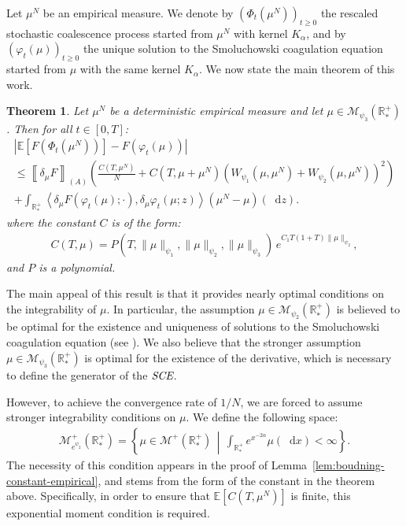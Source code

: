 \documentclass[11pt,a4paper]{article}
\newcommand{\RRP}{\mathbb{R}^+_*}
\newcommand{\MC}{\mathcal{M}}
\newcommand{\SCE}{\emph{SCE}}
\newcommand{\A}{(A)}
\newcommand{\Proc}[1]{\left(#1\right)_{t\geq 0}}
\newcommand{\dd}{\mathop{}\!\mathrm{d}}
\newtheorem{theorem}{Theorem}[section]
\begin{document}
Let $\mu^N$ be an empirical measure. We denote by \(\Proc{\Phi_t(\mu^N)}\) the rescaled stochastic coalescence process started from \(\mu^N\) with kernel \(K_\alpha\), and by \(\Proc{\varphi_t(\mu)}\) the unique solution to the Smoluchowski coagulation equation started from \(\mu\) with the same kernel \(K_\alpha\). We now state the main theorem of this work.

\begin{theorem}\label{thm:main-result}
    Let $\mu^N$ be a deterministic empirical measure and let $\mu \in \MC_{\psi_3}(\RRP)$. Then for all $t \in [0,T]$:
    \begin{multline*}
        \left| \mathbb{E}\left[F\left(\Phi_t\left(\mu^N\right)\right)\right] - F\left(\varphi_t(\mu)\right) \right| \\
        \leq \left\llbracket \delta_\mu F \right\rrbracket_{\A} \left( \frac{C(T,\mu^N)}{N} + C(T,\mu + \mu^N)\left(W_{\psi_1}\left(\mu,\mu^N\right) + W_{\psi_2}\left(\mu,\mu^N\right) \right)^2\right) \\
        + \int_{\RRP} \left\langle \delta_\mu F\left(\varphi_t \left(\mu\right);\cdot \right), \delta_\mu \varphi_t\left(\mu;z \right) \right\rangle \left(\mu^N - \mu\right)(\dd z).
    \end{multline*}
    where the constant $C$ is of the form:
    \begin{align*}
        C(T,\mu) = P(T,\|\mu\|_{\psi_1},\|\mu\|_{\psi_2},\|\mu\|_{\psi_3})\, e^{C_1T(1 + T)\|\mu\|_{\psi_2}},
    \end{align*}
    and $P$ is a polynomial.
\end{theorem}

The main appeal of this result is that it provides nearly optimal conditions on the integrability of $\mu$. In particular, the assumption $\mu \in \MC_{\psi_2}(\RRP)$ is believed to be optimal for the existence and uniqueness of solutions to the Smoluchowski coagulation equation (see \cite{norris1999smoluchowski}). We also believe that the stronger assumption $\mu \in \MC_{\psi_3}(\RRP)$ is optimal for the existence of the derivative, which is necessary to define the generator of the $\SCE$.

However, to achieve the convergence rate of $1/N$, we are forced to assume stronger integrability conditions on $\mu$. We define the following space:
\begin{align*}
    \MC^+_{e^{\psi_2}}(\RRP) = \left\lbrace \mu \in \MC^+(\RRP) \,\middle|\, \int_{\RRP} e^{x^{-2\alpha}} \mu(\dd x) < \infty \right\rbrace.
\end{align*}
The necessity of this condition appears in the proof of Lemma~\ref{lem:boudning-constant-empirical}, and stems from the form of the constant in the theorem above. Specifically, in order to ensure that $\mathbb{E}[C(T,\mu^N)]$ is finite, this exponential moment condition is required.
\end{document}
